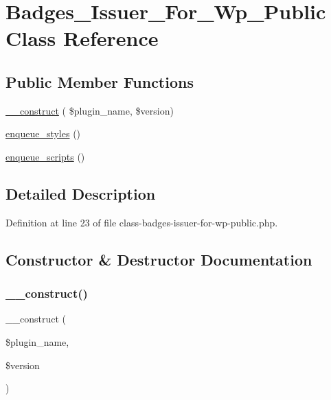 \hypertarget{class_badges___issuer___for___wp___public}{}\section{Badges\+\_\+\+Issuer\+\_\+\+For\+\_\+\+Wp\+\_\+\+Public Class Reference}
\label{class_badges___issuer___for___wp___public}
\subsection*{Public Member Functions}
\begin{DoxyCompactItemize}
\item 
\hyperlink{class_badges___issuer___for___wp___public_a2408861a56b963cb8719d7f596cd800d}{\+\_\+\+\_\+construct} ( \$plugin\+\_\+name, \$version)
\item 
\hyperlink{class_badges___issuer___for___wp___public_a6ec94168591737dfca849a6934db3cdf}{enqueue\+\_\+styles} ()
\item 
\hyperlink{class_badges___issuer___for___wp___public_a8ccf2775cad89ac2c9609e2282c1bbeb}{enqueue\+\_\+scripts} ()
\end{DoxyCompactItemize}


\subsection{Detailed Description}


Definition at line 23 of file class-\/badges-\/issuer-\/for-\/wp-\/public.\+php.



\subsection{Constructor \& Destructor Documentation}
\mbox{\label{class_badges___issuer___for___wp___public_a2408861a56b963cb8719d7f596cd800d}} 
\subsubsection{\texorpdfstring{\+\_\+\+\_\+construct()}{\_\_construct()}}
{\footnotesize\ttfamily \+\_\+\+\_\+construct (\begin{DoxyParamCaption}\item[{}]{\$plugin\+\_\+name,  }\item[{}]{\$version }\end{DoxyParamCaption})}

